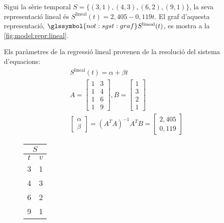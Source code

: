 \begin{example}
  Sigui la sèrie temporal $S=\{ (3,1), (4,3), (6,2), (9,1) \}$, la
  seva representació lineal és $S^\text{lineal}(t) =
  2{,}405-0{,}119t$.  El graf d'aquesta representació,
  $\glssymbol{not:sgst:graf} S^\text{lineal}(t)$, es mostra a la
  \autoref{fig:model:repr:lineal}.

  Els paràmetres de la regressió lineal provenen de la resolució del
  sistema d'equacions:
  \begin{gather*}
    S^\text{lineal}(t) =  \alpha + \beta t \\
     A= \left[\begin{array}{cc}
        1 & 3 \\
        1 & 4 \\
        1 & 6 \\
        1 & 9 
      \end{array}\right],
    B=\left[\begin{array}{c}
        1 \\
        3 \\
        2 \\
        1
      \end{array}\right]\\     
    \left[\begin{array}{c}
        \alpha \\
        \beta
      \end{array}\right] 
    =  (A^TA)^{-1}A^TB =
    \left[\begin{array}{c}
        2{,}405 \\
        0{,}119
      \end{array}\right]   
   \end{gather*}




  \begin{figure}[tp]
  \centering
  \begin{tabular}[c]{|c|c|}
    \multicolumn{2}{c}{$S$} \\ \hline
    $t$  & $v$ \\ \hline
    3  & 1 \\
    4  & 3 \\
    6  & 2 \\
    9  & 1 \\ \hline
  \end{tabular} \qquad
\end{figure}
\end{example}
